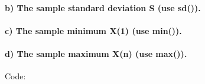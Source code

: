 \documentclass[
]{article}
\begin{document}
\hypertarget{b-the-sample-standard-deviation-s-use-sd.}{%
\paragraph{b) The sample standard deviation S (use
sd()).}\label{b-the-sample-standard-deviation-s-use-sd.}}

\hypertarget{c-the-sample-minimum-x1-use-min.}{%
\paragraph{c) The sample minimum X(1) (use
min()).}\label{c-the-sample-minimum-x1-use-min.}}

\hypertarget{d-the-sample-maximum-xn-use-max.}{%
\paragraph{d) The sample maximum X(n) (use
max()).}\label{d-the-sample-maximum-xn-use-max.}}

Code:
\end{document}
